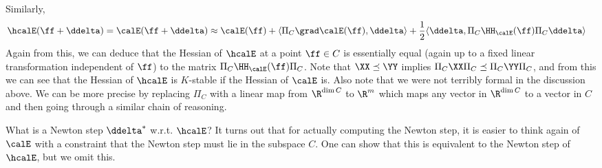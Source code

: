 Similarly,
\begin{align*}
   \hcalE(\ff+\ddelta) = \calE(\ff+\ddelta) & \approx \calE(\ff) + \langle\Pi_C\grad\calE(\ff),\ddelta\rangle + \frac{1}{2}\langle\ddelta,\Pi_C\HH_{\calE}(\ff)\Pi_C\ddelta\rangle
\end{align*}
Again from this, we can deduce that the Hessian of $\hcalE$ at a point
$\ff\in C$ is essentially equal (again up to a fixed linear transformation
independent of $\ff$) to the
matrix $\Pi_C\HH_{\calE}(\ff)\Pi_C$.
Note that $\XX \preceq \YY$ implies  $\Pi_C \XX \Pi_C \preceq \Pi_C
\YY \Pi_C$, and from this we can see that the Hessian of  $\hcalE$ is
$K$-stable if the Hessian of $\calE$ is.
Also note that we were not terribly formal in the discussion above.
We can be more precise by replacing $\Pi_C$ with a linear map from $\R^{\dim
  C}$ to $\R^{m}$ which maps any vector in $\R^{\dim
  C}$ to a vector in $C$ and then going through a similar chain of reasoning.

What is a Newton step $\ddelta^*$ w.r.t. $\hcalE$? It turns out that
for actually computing the Newton step, it is easier to think again of
$\calE$ with a constraint that the Newton step must lie in the
subspace $C$.
One can show that this is equivalent to the Newton step of $\hcalE$,
but we omit this.

